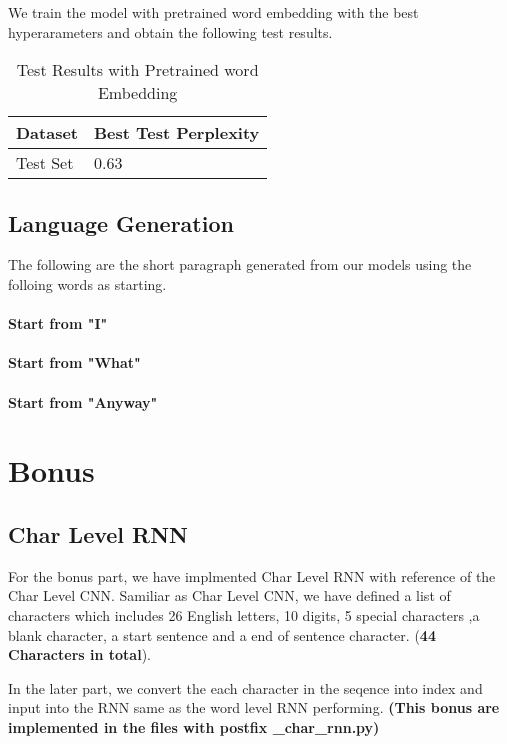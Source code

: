 \documentclass{article}
\begin{document}
We train the model with pretrained word embedding with the best hyperarameters and obtain the following test results.

\begin{table}[htb]
	\caption{Test Results with Pretrained word Embedding}
	\label{sample-table}
	\centering
	\begin{tabular}{ll}
		\toprule
		\cmidrule{1-2}
		Dataset & Best Test Perplexity\\
		\midrule
		Test Set & 0.63   \\
		\bottomrule
	\end{tabular}
\end{table}


\subsection{Language Generation}
The following are the short paragraph generated from our models using the folloing words as starting.

\paragraph{Start from "I"}

\paragraph{Start from "What"}

\paragraph{Start from "Anyway"}

\section{Bonus}

\subsection{Char Level RNN}
For the bonus part, we have implmented Char Level RNN with reference of the Char Level CNN. Samiliar as Char Level CNN, we have defined a list of characters which includes 26 English letters, 10 digits, 5 special characters ,a blank character, a start sentence and a end of sentence character. (\textbf{44 Characters in total}). 

In the later part, we convert the each character in the seqence into index and input into the RNN same as the word level RNN performing.  \textbf{(This bonus are implemented in the files with postfix \_char\_rnn.py)}
\end{document}
